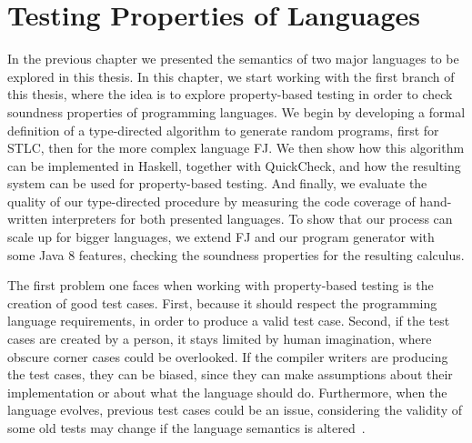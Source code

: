 \documentclass[tese,capa,english]{texufpel}
\begin{document}
















\chapter{Testing Properties of Languages}
\label{chap:testing}

In the previous chapter we presented the semantics of two major languages to be explored in this thesis. In this chapter, we start working with the first branch of this thesis, where the idea is to explore property-based testing in order to check soundness properties of programming languages. We begin by developing a formal definition of a type-directed algorithm to generate random programs, first for STLC, then for the more complex language FJ. We then show how this algorithm can be implemented in Haskell, together with QuickCheck, and how the resulting system can be used for property-based testing. And finally, we evaluate the quality of our type-directed procedure by measuring the code coverage of hand-written interpreters for both presented languages. To show that our process can scale up for bigger languages, we extend FJ and our program generator with some Java 8 features, checking the soundness properties for the resulting calculus.

The first problem one faces when working with property-based testing is the creation of good test cases. First, because it should respect the programming language requirements, in order to produce a valid test case. Second, if the test cases are created by a person, it stays limited by human imagination, where obscure corner cases could be overlooked. If the compiler writers are producing the test cases, they can be biased, since they can make assumptions about their implementation or about what the language should do. Furthermore, when the language evolves, previous test cases could be an issue, considering the validity of some old tests may change if the language semantics is altered~\cite{Allwood:2009:TJF:1628315.1628375}. 
\end{document}
